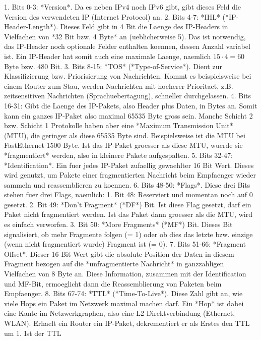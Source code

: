 1. Bits 0-3: *Version*. Da es neben IPv4 noch IPv6 gibt, gibt dieses Feld die
   Version des verwendeten IP (Internet Protocol) an.
2. Bits 4-7: *IHL* (*IP-Header-Length*). Dieses Feld gibt in 4 Bit die Laenge
   des IP-Headers in Vielfachen von *32 Bit bzw. 4 Byte* an (ueblicherweise
   5). Das ist notwendig, das IP-Header noch optionale Felder enthalten koennen,
   dessen Anzahl variabel ist. Ein IP-Header hat somit auch eine maximale
   Laenge, naemlich $15 \cdot 4 = 60$ Byte bzw. 480 Bit.
3. Bits 8-15: *TOS* (*Type-of-Service*). Dient zur Klassifizierung
   bzw. Priorisierung von Nachrichten. Kommt es beispielsweise bei einem Router
   zum Stau, werden Nachrichten mit hoeherer Prioritaet, z.B. zeitsensitiven
   Nachrichten (Sprachuebertagung), schneller durchgelassen.
4. Bits 16-31: Gibt die Laenge des IP-Pakets, also Header plus Daten, in Bytes
   an. Somit kann ein ganzes IP-Paket also maximal 65535 Byte gross sein. Manche
   Schicht 2 bzw. Schicht 1 Protokolle haben aber eine *Maximum Transmission
   Unit* (MTU), die geringer als diese 65535 Byte sind. Beispielsweise ist die
   MTU bei FastEthernet 1500 Byte. Ist das IP-Paket groesser als diese MTU,
   wuerde sie *fragmentiert* werden, also in kleinere Pakete aufgespalten.
5. Bits 32-47: *Identification*. Ein fuer jedes IP-Paket zufaellig gewaehlter 16
   Bit Wert. Dieses wird genutzt, um Pakete einer fragmentierten Nachricht beim
   Empfaenger wieder sammeln und reassemblieren zu koennen.
6. Bits 48-50: *Flags*. Diese drei Bits stehen fuer drei Flags, naemlich:
   1. Bit 48: Reserviert und momentan noch auf 0 gesetzt.
   2. Bit 49: *Don't Fragment* (*DF*) Bit. Ist diese Flag gesetzt, darf ein
      Paket nicht fragmentiert werden. Ist das Paket dann groesser als die MTU,
      wird es einfach verworfen.
   3. Bit 50: *More Fragments* (*MF*) Bit. Dieses Bit signalisiert, ob mehr
      Fragmente folgen (= 1) oder ob dies das letzte bzw. einzige (wenn nicht
      fragmentiert wurde) Fragment ist (= 0).
7. Bits 51-66: *Fragment Offset*. Dieser 16-Bit Wert gibt die absolute Position
   der Daten in diesem Fragment bezogen auf die *unfragmentierte Nachricht* in
   ganzzahligen Vielfachen von 8 Byte an. Diese Information, zusammen mit der
   Identification und MF-Bit, ermoeglicht dann die Reassemblierung von Paketen
   beim Empfaenger.
8. Bits 67-74: *TTL* (*Time-To-Live*). Diese Zahl gibt an, wie viele Hops ein
   Paket im Netzwerk maximal machen darf. Ein *Hop* ist dabei eine Kante im
   Netzwerkgraphen, also eine L2 Direktverbindung (Ethernet, WLAN). Erhaelt ein
   Router ein IP-Paket, dekrementiert er als Erstes den TTL um 1. Ist der TTL
